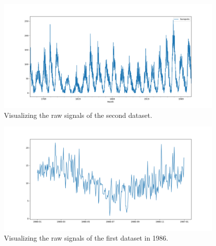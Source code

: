 \documentclass[12pt]{article}
\begin{document}
\begin{enumerate}
\begin{figure}[]
    \centering
    \begin{minipage}[b]{1\textwidth}
        \includegraphics[width=\textwidth]{figures/Ass1/Ass1_D2_raw_signal.png}
    \end{minipage}
    \caption{Visualizing the raw signals of the second dataset.}
    \label{fig:Ass1_D2_raw_signal}
\end{figure}

\begin{figure}[]
    \centering
    \begin{minipage}[b]{1\textwidth}
        \includegraphics[width=\textwidth]{figures/Ass1/Ass1_D1_raw_signal_1986.png}
    \end{minipage}
    \caption{Visualizing the raw signals of the first dataset in 1986.}
    \label{fig:Ass1_D1_raw_signal_1986}
\end{figure}


\end{enumerate}
\end{document}

